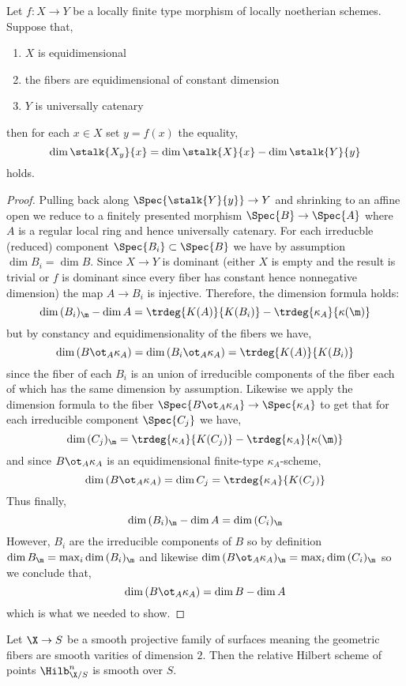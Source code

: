 \documentclass[12pt]{article}
\begin{document}
\begin{lemma}
Let $f : X \to Y$ be a locally finite type morphism of locally noetherian schemes. Suppose that,
\begin{enumerate}
\item $X$ is equidimensional
\item the fibers are equidimensional of constant dimension
\item $Y$ is universally catenary
\end{enumerate}
then for each $x \in X$ set $y = f(x)$ the equality,
\[ \dim{\stalk{X_y}{x}} = \dim{\stalk{X}{x}} - \dim{\stalk{Y}{y}} \]
holds. 
\end{lemma}

\begin{proof}
Pulling back along $\Spec{\stalk{Y}{y}} \to Y$ and shrinking to an affine open we reduce to a finitely presented morphism $\Spec{B} \to \Spec{A}$ where $A$ is a regular local ring and hence universally catenary. For each irreducble (reduced) component $\Spec{B_i} \subset \Spec{B}$ we have by assumption $\dim{B_i} = \dim{B}$. Since $X \to Y$ is dominant (either $X$ is empty and the result is trivial or $f$ is dominant since every fiber has constant hence nonnegative dimension) the map $A \to B_i$ is injective. Therefore, the dimension formula holds:
\[ \dim{(B_i)_\m} - \dim{A} = \trdeg{K(A)}{K(B_i)} - \trdeg{\kappa_A}{\kappa(\m)} \]
but by constancy and equidimensionality of the fibers we have,
\[ \dim{(B \ot_A \kappa_A)} = \dim{(B_i \ot_A \kappa_A)} = \trdeg{K(A)}{K(B_i)} \]
since the fiber of each $B_i$ is an union of irreducible components of the fiber each of which has the same dimension by assumption. Likewise we apply the dimension formula to the fiber $\Spec{B \ot_A \kappa_A} \to \Spec{\kappa_A}$ to get that for each irreducible component $\Spec{C_j}$ we have,
\[ \dim{(C_j)_\m} = \trdeg{\kappa_A}{K(C_j)} - \trdeg{\kappa_A}{\kappa(\m)} \]
and since $B \ot_A \kappa_A$ is an equidimensional finite-type $\kappa_A$-scheme,
\[ \dim{(B \ot_A \kappa_A)} = \dim{C_j} = \trdeg{\kappa_A}{K(C_j)} \] 
Thus finally,
\[ \dim{(B_i)_\m} - \dim{A} = \dim{(C_i)_\m} \]
However, $B_i$ are the irreducible components of $B$ so by definition $\dim{B_\m} = \max_i \dim{(B_i)_\m}$ and likewise $\dim{(B \ot_A \kappa_A)_\m} = \max_i \dim{(C_i)_\m}$ so we conclude that,
\[ \dim{(B \ot_A \kappa_A)} = \dim{B} - \dim{A} \]
which is what we needed to show.
\end{proof}

\begin{prop}
Let $\X \to S$ be a smooth projective family of surfaces meaning the geometric fibers are smooth varities of dimension $2$. Then the relative Hilbert scheme of points $\Hilb_{\X / S}^n$ is smooth over $S$.
\end{prop}
\end{document}
